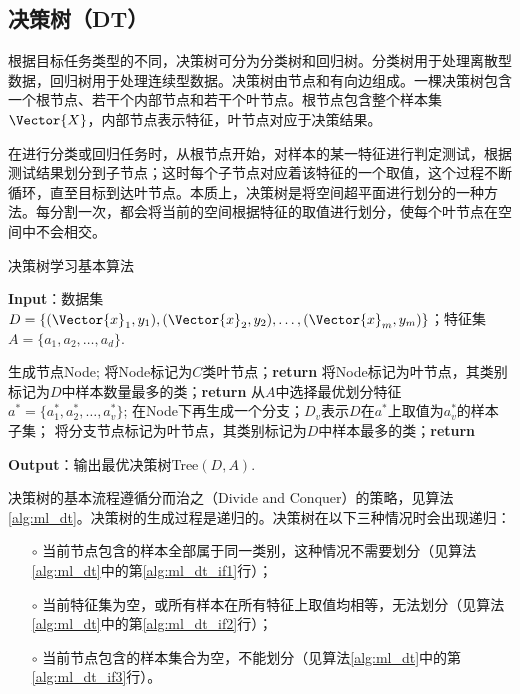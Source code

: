\subsection{决策树（DT）}\label{sec:ml_dt}

根据目标任务类型的不同，决策树可分为分类树和回归树。分类树用于处理离散型数据，回归树用于处理连续型数据。决策树由节点和有向边组成。一棵决策树包含一个根节点、若干个内部节点和若干个叶节点。根节点包含整个样本集$\Vector{X}$，内部节点表示特征，叶节点对应于决策结果。

在进行分类或回归任务时，从根节点开始，对样本的某一特征进行判定测试，根据测试结果划分到子节点；这时每个子节点对应着该特征的一个取值，这个过程不断循环，直至目标到达叶节点。本质上，决策树是将空间超平面进行划分的一种方法。每分割一次，都会将当前的空间根据特征的取值进行划分，使每个叶节点在空间中不会相交。

\begin{algorithm}[!htbp]
  \small
  \caption{决策树学习基本算法}
  \label{alg:ml_dt}
  \textbf{Input}：{数据集$D=\{(\Vector{x}_1,y_1),(\Vector{x}_2,y_2),\ldots,(\Vector{x}_m,y_m)\}$；特征集$A=\{a_1,a_2,\ldots,a_d\}$.}
  \begin{algorithmic}[1]
    \State 生成节点Node;
    \State 将Node标记为$C$类叶节点；\textbf{return}\label{alg:ml_dt_if1}
    \EndIf
    \State 将Node标记为叶节点，其类别标记为$D$中样本数量最多的类；\textbf{return}\label{alg:ml_dt_if2}
    \EndIf
    \State 从$A$中选择最优划分特征$a^*=\{a_1^*,a_2^*,\ldots,a_v^*\}$;
      \State 在Node下再生成一个分支；$D_v$表示$D$在$a^*$上取值为$a_v^*$的样本子集；
      \State 将分支节点标记为叶节点，其类别标记为$D$中样本最多的类；\textbf{return} \label{alg:ml_dt_if3}
      \EndIf 
    \EndFor
    \EndProcedure
  \end{algorithmic}
  \textbf{Output}：{输出最优决策树Tree$(D,A)$.}
\end{algorithm}

决策树的基本流程遵循分而治之（Divide and Conquer）的策略，见算法\ref{alg:ml_dt}。决策树的生成过程是递归的。决策树在以下三种情况时会出现递归：
\begin{enumerate}
  \item[$\circ$] 当前节点包含的样本全部属于同一类别，这种情况不需要划分（见算法\ref{alg:ml_dt}中的第\ref{alg:ml_dt_if1}行）；
  \item[$\circ$] 当前特征集为空，或所有样本在所有特征上取值均相等，无法划分（见算法\ref{alg:ml_dt}中的第\ref{alg:ml_dt_if2}行）；
  \item[$\circ$] 当前节点包含的样本集合为空，不能划分（见算法\ref{alg:ml_dt}中的第\ref{alg:ml_dt_if3}行）。
\end{enumerate}

